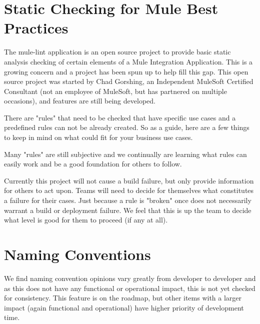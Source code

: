 \documentclass[a4paper,12pt]{article} %
\begin{document}

\section{Static Checking for Mule Best Practices}

The mule-lint application is an open source project to provide basic static analysis checking of certain elements of a Mule Integration Application. This is a growing concern and a project has been spun up to help fill this gap. This open source project was started by Chad Gorshing, an Independent MuleSoft Certified Consultant (not an employee of MuleSoft, but has partnered on multiple occasions), and features are still being developed.

There are "rules" that need to be checked that have specific use cases and a predefined rules can not be already created. So as a guide, here are a few things to keep in mind on what could fit for your business use cases.

Many "rules" are still subjective and we continually are learning what rules can easily work and be a good foundation for others to follow.

Currently this project will not cause a build failure, but only provide information for others to act upon. Teams will need to decide for themselves what constitutes a failure for their cases. Just because a rule is "broken" once does not necessarily warrant a build or deployment failure. We feel that this is up the team to decide what level is good for them to proceed (if any at all).


\section{Naming Conventions}

We find naming convention opinions vary greatly from developer to developer and as this does not have any functional or operational impact, this is not yet checked for consistency. This feature is on the roadmap, but other items with a larger impact (again functional and operational) have higher priority of development time.
\end{document}
